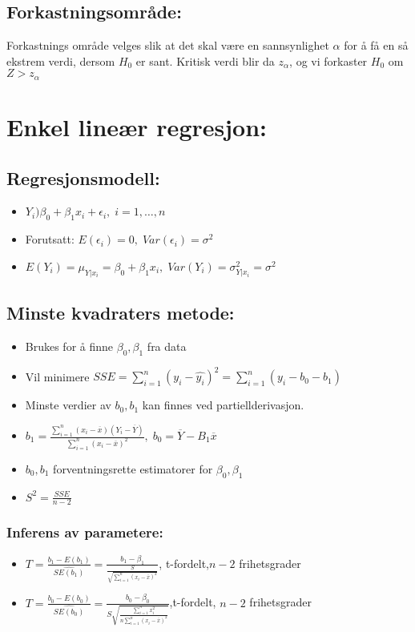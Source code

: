 \documentclass[8pt,a4paper,twocolumn,twoside]{article}
\begin{document}
\subsection*{Forkastningsområde:}
Forkastnings område velges slik at det skal være en sannsynlighet $\alpha$ for å få en så ekstrem verdi, dersom $H_0$ er sant.
Kritisk verdi blir da $z_\alpha$, og vi forkaster $H_0$ om $Z>z_\alpha$
%
%
\section*{Enkel lineær regresjon:}
\subsection*{Regresjonsmodell:}
\begin{itemize}[topsep=0pt,itemsep=0pt, partopsep=0pt]
    \item $Y_i)\beta_0+\beta_1x_i+\epsilon_i,\;i=1,\dots,n$
    \item Forutsatt: $E(\epsilon_i) = 0,\;Var(\epsilon_i)=\sigma^2$
    \item $E(Y_i)=\mu_{Y|x_i}=\beta_0+\beta_1x_i,\;Var(Y_i)=\sigma^2_{Y|x_i}=\sigma^2$
\end{itemize}
\subsection*{Minste kvadraters metode:}
\begin{itemize}[topsep=0pt,itemsep=0pt, partopsep=0pt]
    \item Brukes for å finne $\beta_0,\beta_1$ fra data
    \item Vil minimere $SSE=\sum_{i=1}^n(y_i-\hat{y_i})^2=\sum_{i=1}^n(y_i-b_0-b_1)$
    \item Minste verdier av $b_0,b_1$ kan finnes ved partiellderivasjon.
    \item $b_1=\frac{\sum_{i=1}^n(x_i-\overline{x})(Y_i-\overline{Y})}{\sum_{i=1}^n(x_i-\overline{x})^2},\; b_0=\overline{Y}-B_1\overline{x}$
    \item $b_0, b_1$ forventningsrette estimatorer for $\beta_0,\beta_1$
    \item $S^2=\frac{SSE}{n-2}$
\end{itemize}
\subsubsection*{Inferens av parametere:}
\begin{itemize}[topsep=0pt,itemsep=0pt, partopsep=0pt]
    \item $T=\frac{b_1-E(b_1)}{\hat{SE(b_1)}}=\frac{b_1-\beta_1}{\frac{S}{\sqrt{\sum_{i=1}^n(x_i-\overline{x})^2}}}$, t-fordelt,$n-2$ frihetsgrader
    \item $T=\frac{b_0-E(b_0)}{\hat{SE(b_0)}}=\frac{b_0-\beta_0}{S\sqrt{\frac{\sum_{i=1}^nx^2_i}{n\sum_{i=1}^n(x_i-\overline{x})^2}}}$,t-fordelt, $n-2$ frihetsgrader
\end{itemize}
\end{document}
